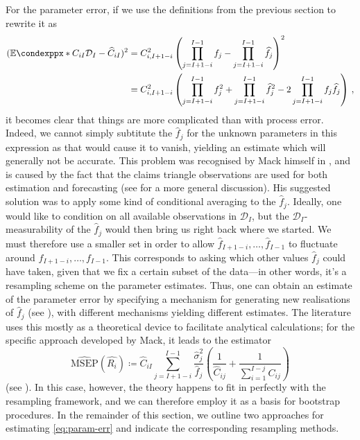 \documentclass[a4paper]{book}
\begin{document}
For the parameter error, if we use the definitions from the previous section to rewrite it as
\begin{align} \label{eq:param-err}
  (\condexpp*{C_{iI}}{\mathcal{D}_I} - \widehat{C}_{iI})^2 & = C^2_{i, I+1-i} \left( \prod_{j=I+1-i}^{I-1}f_j - \prod_{j=I+1-i}^{I-1}\widehat{f}_j \right)^2                                                  \\
                                                           & = C^2_{i, I+1-i} \left( \prod_{j=I+1-i}^{I-1}f^2_j + \prod_{j=I+1-i}^{I-1}\widehat{f}^2_j - 2 \prod_{j=I+1-i}^{I-1}f_j \widehat{f}_j \right) \,,
\end{align}
it becomes clear that things are more complicated than with process error. Indeed, we cannot simply subtitute the $\widehat{f}_j$ for the unknown parameters in this expression as that would cause it to vanish, yielding an estimate which will generally not be accurate. This problem was recognised by Mack himself in \cite{mack:chain-ladder-variability}, and is caused by the fact that the claims triangle observations are used for both estimation and forecasting (see \cite[Section 2]{lindholm:msep} for a more general discussion). His suggested solution was to apply some kind of conditional averaging to the $\widehat{f}_j$. Ideally, one would like to condition on all available observations in $\mathcal{D}_I$, but the $\mathcal{D}_I$-measurability of the $\widehat{f}_j$ would then bring us right back where we started. We must therefore use a smaller set in order to allow $\widehat{f}_{I + 1 - i}, \dots, \widehat{f}_{I - 1}$ to fluctuate around $f_{I + 1 - i}, \dots, f_{I - 1}$. This corresponds to asking which other values $\widehat{f}_j$ could have taken, given that we fix a certain subset of the data---in other words, it's a resampling scheme on the parameter estimates. Thus, one can obtain an estimate of the parameter error by specifying a mechanism for generating new realisations of $\widehat{f}_j$ (see \cites{wuthrich:chain-ladder-msep}[44 \psqq]{wuthrich:stochastic-reserving}), with different mechanisms yielding different estimates. The literature uses this mostly as a theoretical device to facilitate analytical calculations; for the specific approach developed by Mack, it leads to the estimator
\begin{equation} \label{eq:mack-msep-estimator}
  \widehat{\mathrm{MSEP}}(\widehat{R_i}) \coloneqq \widehat{C}_{iI} \sum_{j = I + 1 - i}^{I - 1} \frac{\widehat{\sigma}^2_j}{\widehat{f}_j} \left( \frac{1}{\widehat{C}_{ij}} + \frac{1}{\sum_{i = 1}^{I - j} C_{ij}} \right)
\end{equation}
(see \cite[11]{mack:chain-ladder-variability}).
In this case, however, the theory happens to fit in perfectly with the resampling framework, and we can therefore employ it as a basis for bootstrap procedures. In the remainder of this section, we outline two approaches for estimating \cref{eq:param-err} and indicate the corresponding resampling methods.
\end{document}
